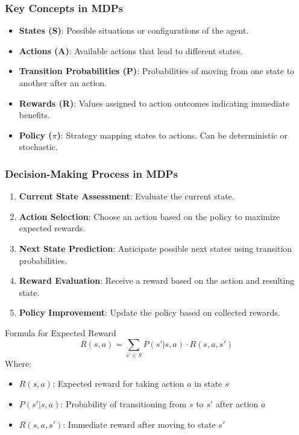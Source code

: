 \documentclass[aspectratio=169]{beamer}
\begin{document}
\begin{frame}[fragile]
    \frametitle{Key Concepts in MDPs}
    \begin{itemize}
        \item \textbf{States (S)}: Possible situations or configurations of the agent.
        \item \textbf{Actions (A)}: Available actions that lead to different states.
        \item \textbf{Transition Probabilities (P)}: Probabilities of moving from one state to another after an action.
        \item \textbf{Rewards (R)}: Values assigned to action outcomes indicating immediate benefits.
        \item \textbf{Policy ($\pi$)}: Strategy mapping states to actions. Can be deterministic or stochastic.
    \end{itemize}
\end{frame}

\begin{frame}[fragile]
    \frametitle{Decision-Making Process in MDPs}
    \begin{enumerate}
        \item \textbf{Current State Assessment}: Evaluate the current state.
        \item \textbf{Action Selection}: Choose an action based on the policy to maximize expected rewards.
        \item \textbf{Next State Prediction}: Anticipate possible next states using transition probabilities.
        \item \textbf{Reward Evaluation}: Receive a reward based on the action and resulting state.
        \item \textbf{Policy Improvement}: Update the policy based on collected rewards.
    \end{enumerate}
    
    \begin{block}{Formula for Expected Reward}
        \begin{equation}
            R(s, a) = \sum_{s' \in S} P(s' | s, a) \cdot R(s, a, s')
        \end{equation}
        Where:
        \begin{itemize}
            \item \( R(s, a) \): Expected reward for taking action \( a \) in state \( s \)
            \item \( P(s' | s, a) \): Probability of transitioning from \( s \) to \( s' \) after action \( a \)
            \item \( R(s, a, s') \): Immediate reward after moving to state \( s' \)
        \end{itemize}
    \end{block}
\end{frame}
\end{document}
